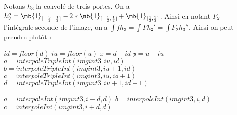 \begin{algorithm}
\caption{$interpoleInt(imgint,i,d)$}
\end{algorithm}



Notons $h_3$ la convolé de trois portes. On a $h_3'' = \mb{1}_{[-\frac{3}{2} -\frac{1}{2}]}-2*\mb{1}_{[-\frac{1}{2},\frac{1}{2}]}+\mb{1}_{[\frac{1}{2},\frac{3}{2}]}$.
Ainsi en notant $F_2$ l'intégrale seconde de l'image, on a $\int f h_3 = \int F h_3' = \int F_2 h_3''$.
Ainsi on peut prendre plutôt : 

\begin{algorithm}
\caption{$interpole3(imgint,u,d)$}
$id=floor(d)$\;
$iu=floor(u)$\;
$x = d-id$\;
$y = u-iu$\;
$a=interpoleTripleInt(imgint3,iu,id)$\;
$b=interpoleTripleInt(imgint3,iu+1,id)$\;
$c=interpoleTripleInt(imgint3,iu,id+1)$\;
$d=interpoleTripleInt(imgint3,iu+1,id+1)$\;
\end{algorithm}

\begin{algorithm}
\caption{$interpoleTripleInt(imgint3,i,d)$}
$a=interpoleInt(imgint3,i-d,d)$\;
$b=interpoleInt(imgint3,i,d)$\;
$c=interpoleInt(imgint3,i+d,d)$\;
\end{algorithm}
